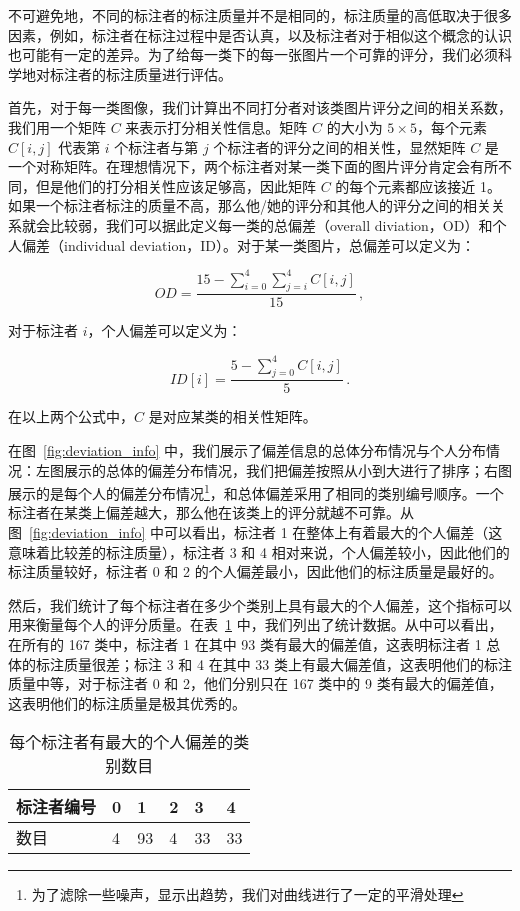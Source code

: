 不可避免地，不同的标注者的标注质量并不是相同的，标注质量的高低取决于很多因素，例如，标注者在标注过程中是否认真，以及标注者对于相似这个概念的认识也可能有一定的差异。为了给每一类下的每一张图片一个可靠的评分，我们必须科学地对标注者的标注质量进行评估。

首先，对于每一类图像，我们计算出不同打分者对该类图片评分之间的相关系数，我们用一个矩阵 $C$ 来表示打分相关性信息。矩阵 $C$ 的大小为 $5 \times 5$，每个元素 $C[i,j]$ 代表第 $i$ 个标注者与第 $j$ 个标注者的评分之间的相关性，显然矩阵 $C$ 是一个对称矩阵。在理想情况下，两个标注者对某一类下面的图片评分肯定会有所不同，但是他们的打分相关性应该足够高，因此矩阵 $C$ 的每个元素都应该接近 1。如果一个标注者标注的质量不高，那么他/她的评分和其他人的评分之间的相关关系就会比较弱，我们可以据此定义每一类的总偏差（overall diviation，OD）和个人偏差（individual deviation，ID）。对于某一类图片，总偏差可以定义为：

\begin{equation}
OD = \frac{15 - \sum_{i=0}^{4}\sum_{j=i}^{4}C[i,j]}{15}\, ,
\end{equation}

对于标注者 $i$，个人偏差可以定义为：

\begin{equation}
	ID[i] = \frac{5 - \sum_{j=0}^{4}C[i, j]}{5}\, .
\end{equation}

在以上两个公式中，$C$ 是对应某类的相关性矩阵。

在图~\ref{fig:deviation_info} 中，我们展示了偏差信息的总体分布情况与个人分布情况：左图展示的总体的偏差分布情况，我们把偏差按照从小到大进行了排序；右图展示的是每个人的偏差分布情况\footnote{为了滤除一些噪声，显示出趋势，我们对曲线进行了一定的平滑处理}，和总体偏差采用了相同的类别编号顺序。一个标注者在某类上偏差越大，那么他在该类上的评分就越不可靠。从图~\ref{fig:deviation_info} 中可以看出，标注者 1 在整体上有着最大的个人偏差（这意味着比较差的标注质量），标注者 3 和 4 相对来说，个人偏差较小，因此他们的标注质量较好，标注者 0 和 2 的个人偏差最小，因此他们的标注质量是最好的。

然后，我们统计了每个标注者在多少个类别上具有最大的个人偏差，这个指标可以用来衡量每个人的评分质量。在表~\ref{table:largest_devi_num} 中，我们列出了统计数据。从中可以看出，在所有的 167 类中，标注者 1 在其中 93 类有最大的偏差值，这表明标注者 1 总体的标注质量很差；标注 3 和 4 在其中 33 类上有最大偏差值，这表明他们的标注质量中等，对于标注者 0 和 2，他们分别只在 167 类中的 9 类有最大的偏差值，这表明他们的标注质量是极其优秀的。

\begin{table}[!t]
	\centering
	\caption{每个标注者有最大的个人偏差的类别数目}
	\begin{tabular}{@{}llllll@{}}
		\toprule
		标注者编号	    &  0		& 1 & 2 & 3 & 4  \\
		\midrule
		数目 &  4 & 93 & 4 & 33 & 33 \\
		\bottomrule
	\end{tabular}
	\label{table:largest_devi_num}
\end{table}

